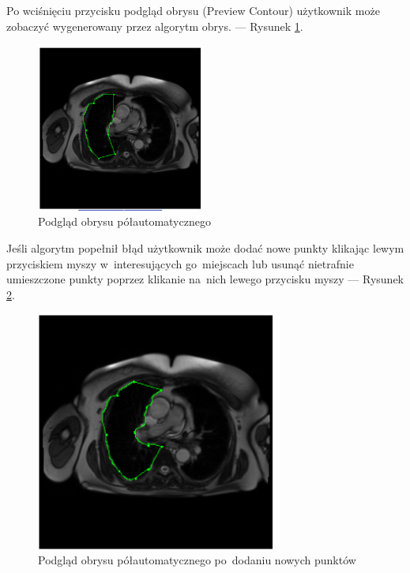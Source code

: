 \documentclass[a4paper,11pt,twoside,openright]{report}
\theoremstyle{definition}
\begin{document}
Po wciśnięciu przycisku podgląd obrysu (Preview Contour) użytkownik może
zobaczyć wygenerowany przez algorytm obrys. --- Rysunek \ref{fig:12}.

\begin{figure}[h!]
	\center
	\includegraphics[width=0.5\textwidth]{12}
	\caption{Podgląd obrysu półautomatycznego}
    	\label{fig:12}
\end{figure}

\pagebreak

Jeśli algorytm popełnił błąd użytkownik może dodać nowe punkty klikając lewym
przyciskiem myszy w~interesujących go~miejscach lub usunąć nietrafnie umieszczone
punkty poprzez klikanie na~nich lewego przycisku myszy --- Rysunek \ref{fig:13}.

\begin{figure}[h!]
	\center
	\includegraphics[width=0.7\textwidth]{13}
	\caption{Podgląd obrysu półautomatycznego po~dodaniu nowych punktów}
    	\label{fig:13}
\end{figure}
\end{document}
